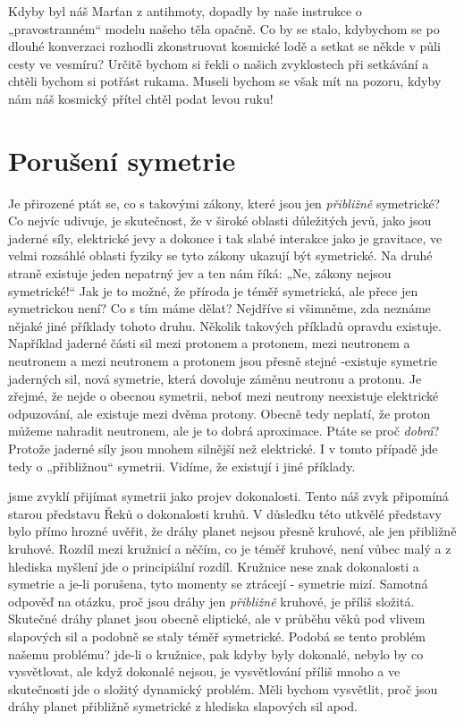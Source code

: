     Kdyby byl náš Marťan z antihmoty, dopadly by naše instrukce o „pravostranném“ modelu našeho těla
    opačně. Co by se stalo, kdybychom se po dlouhé konverzaci rozhodli zkonstruovat kosmické lodě a
    setkat se někde v půli cesty ve vesmíru? Určitě bychom si řekli o našich zvyklostech při
    setkávání a chtěli bychom si potřást rukama. Museli bychom se však mít na pozoru, kdyby nám náš
    kosmický přítel chtěl podat levou ruku!
  
  \section{Porušení symetrie}\label{fyz:IchapLIIsecIX}
    Je přirozené ptát se, co s takovými zákony, které jsou jen \emph{přibližně} symetrické? Co
    nejvíc udivuje, je skutečnost, že v široké oblasti důležitých jevů, jako jsou jaderné síly,
    elektrické jevy a dokonce i tak slabé interakce jako je gravitace, ve velmi rozsáhlé oblasti
    fyziky se tyto zákony ukazují být symetrické. Na druhé straně existuje jeden nepatrný jev a ten
    nám říká: „Ne, zákony nejsou symetrické!“ Jak je to možné, že příroda je téměř symetrická, ale
    přece jen symetrickou není? Co s tím máme dělat? Nejdříve si všimněme, zda neznáme nějaké jiné
    příklady tohoto druhu. Několik takových příkladů opravdu existuje. Například jaderné části sil
    mezi protonem a protonem, mezi neutronem a neutronem a mezi neutronem a protonem jsou přesně
    stejné -existuje symetrie jaderných sil, nová symetrie, která dovoluje záměnu neutronu a
    protonu. Je zřejmé, že nejde o obecnou symetrii, neboť mezi neutrony neexistuje elektrické
    odpuzování, ale existuje mezi dvěma protony. Obecně tedy neplatí, že proton můžeme nahradit
    neutronem, ale je to dobrá aproximace. Ptáte se proč \emph{dobrá}? Protože jaderné síly jsou
    mnohem silnější než elektrické. I v tomto případě jde tedy o „přibližnou“ symetrii. Vidíme, že
    existují i jiné příklady.
    
    jsme zvyklí přijímat symetrii jako projev dokonalosti. Tento náš zvyk připomíná starou představu
    Řeků o dokonalosti kruhů. V důsledku této utkvělé představy bylo přímo hrozné uvěřit, že dráhy
    planet nejsou přesně kruhové, ale jen přibližně kruhové. Rozdíl mezi kružnicí a něčím, co je
    téměř kruhové, není vůbec malý a z hlediska myšlení jde o principiální rozdíl. Kružnice nese
    znak dokonalosti a symetrie a je-li porušena, tyto momenty se ztrácejí - symetrie mizí. Samotná
    odpověď na otázku, proč jsou dráhy jen \emph{přibližně} kruhové, je příliš složitá. Skutečné
    dráhy planet jsou obecně eliptické, ale v průběhu věků pod vlivem slapových sil a podobně se
    staly téměř symetrické. Podobá se tento problém našemu problému? jde-li o kružnice, pak kdyby
    byly dokonalé, nebylo by co vysvětlovat, ale když dokonalé nejsou, je vysvětlování příliš mnoho
    a ve skutečnosti jde o složitý dynamický problém. Měli bychom vysvětlit, proč jsou dráhy planet
    přibližně symetrické z hlediska slapových sil apod.
    

